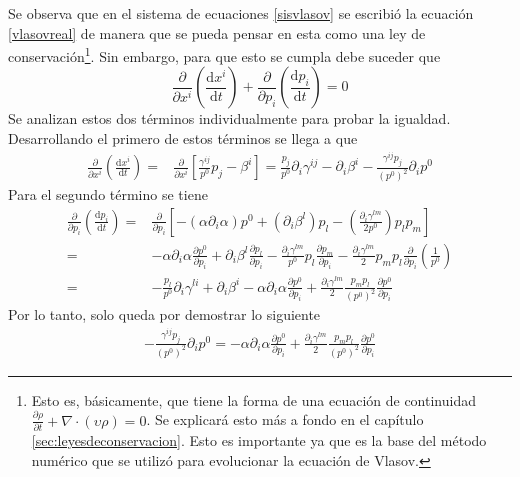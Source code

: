 \documentclass[11pt,twoside,openright,spanish]{report}
\numberwithin{equation}{chapter}
\numberwithin{figure}{chapter}
\numberwithin{table}{chapter}
\begin{document}
Se observa que en el sistema de ecuaciones \eqref{sisvlasov} se escribió la ecuación \eqref{vlasovreal} de manera que se pueda pensar en esta como una ley de conservación\footnote{Esto es, básicamente, que tiene la forma de una ecuación de continuidad $\frac{\partial \rho}{\partial t}+\nabla\cdot\left(\upsilon\rho\right)=0$. Se explicará esto más a fondo en el capítulo \ref{sec:leyesdeconservacion}. Esto es importante ya que es la base del método numérico que se utilizó para evolucionar la ecuación de Vlasov.}. Sin embargo, para que esto se cumpla debe suceder que
\begin{equation}
\frac{\partial}{\partial x^i}\left(\frac{\text{d}x^i}{\text{d}t}\right)+\frac{\partial}{\partial p_i}\left(\frac{\text{d}p_i}{\text{d}t}\right)=0
\label{dxdtdpdt}
\end{equation}
Se analizan estos dos términos individualmente para probar la igualdad. Desarrollando el primero de estos términos se llega a que
\begin{align*}
\frac{\partial}{\partial x^i}\left(\frac{\text{d}x^i}{\text{d}t}\right)=&\frac{\partial}{\partial x^i}\left[\frac{\gamma^{ij}}{p^0}p_j-\beta^i\right]=\frac{p_j}{p^0}\partial_i \gamma^{ij}-\partial_i\beta^i-\frac{\gamma^{ij}p_j}{\left(p^0\right)^2}\partial_i p^0
\end{align*}
Para el segundo término se tiene
\begin{align*}
\frac{\partial}{\partial p_i}\left(\frac{\text{d}p_i}{\text{d}t}\right)=&\frac{\partial}{\partial p_i}\left[-\left(\alpha\partial_i\alpha\right)p^0+\left(\partial_i\beta^l\right)p_l-\left(\frac{\partial_i\gamma^{lm}}{2p^0}\right)p_lp_m\right]\\
=& -\alpha\partial_i\alpha\frac{\partial p^0}{\partial p_i}+\partial_i\beta^l\frac{\partial p_l}{\partial p_i}-\frac{\partial_i \gamma^{lm}}{p^0}p_l\frac{\partial p_m}{\partial p_i}-\frac{\partial_i \gamma^{lm}}{2}p_mp_l\frac{\partial}{\partial p_i}\left(\frac{1}{p^0}\right)\\
=&-\frac{p_l}{p^0}\partial_i\gamma^{li}+\partial_i\beta^i-\alpha\partial_i\alpha\frac{\partial p^0}{\partial p_i}+\frac{\partial_i\gamma^{lm}}{2}\frac{p_mp_l}{\left(p^0\right)^2}\frac{\partial p^0}{\partial p_i}
\end{align*}
Por lo tanto, solo queda por demostrar lo siguiente
\begin{align*}
-\frac{\gamma^{ij}p_j}{\left(p^0\right)^2}\partial_i p^0=-\alpha\partial_i\alpha\frac{\partial p^0}{\partial p_i}+\frac{\partial_i\gamma^{lm}}{2}\frac{p_mp_l}{\left(p^0\right)^2}\frac{\partial p^0}{\partial p_i}
\end{align*}
\end{document}
